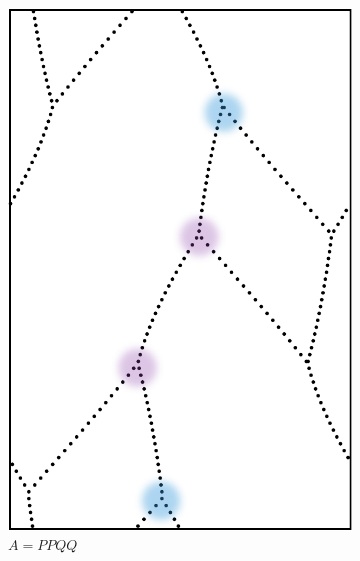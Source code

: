 \documentclass[12pt,twoside]{reedthesis}
\theoremstyle{definition}
\begin{document}
\begin{figure}[h]
  \centering
  \begin{subfigure}[t]{0.31\textwidth}
    \centering
    \includegraphics[width=\textwidth]{figures/subset_loop_forks_ppqq.pdf}
    \caption*{$A = PPQQ$}
  \end{subfigure}
  \hspace{5mm}
  \begin{subfigure}[t]{0.31\textwidth}
    \centering

\end{subfigure}
\end{figure}
\end{document}

